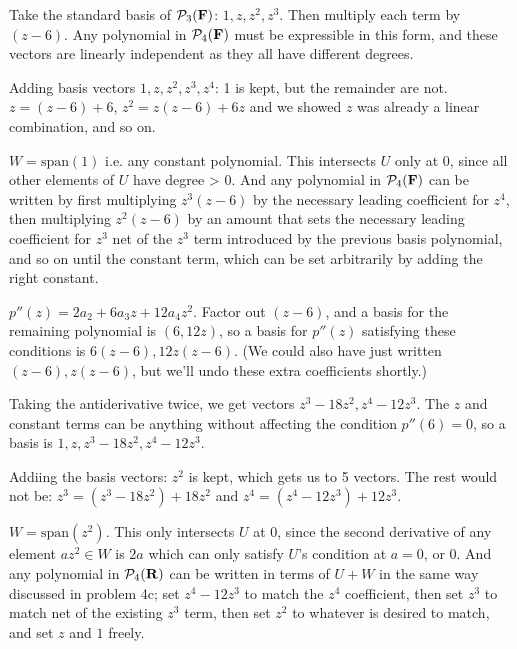 \documentclass{article}
\begin{document}

Take the standard basis of $\mathcal{P}_3(\mathbf{F})$: $1, z, z^2, z^3$. Then
multiply each term by $(z-6)$. Any polynomial in $\mathcal{P}_4(\mathbf{F})$ must be
expressible in this form, and these vectors are linearly independent as they all
have different degrees.


Adding basis vectors $1, z, z^2, z^3, z^4$: 1 is kept, but the remainder are
not. $z = (z-6) + 6$, $z^2 = z(z-6) + 6z$ and we showed $z$ was already a linear
combination, and so on.


$W = \text{span}(1)$ i.e. any constant polynomial. This intersects $U$ only at
0, since all other elements of $U$ have degree > 0. And any polynomial in
$\mathcal{P}_4(\mathbf{F})$ can be written by first multiplying $z^3(z-6)$ by the
necessary leading coefficient for $z^4$, then multiplying $z^2(z-6)$ by an
amount that sets the necessary leading coefficient for $z^3$ net of the $z^3$
term introduced by the previous basis polynomial, and so on until the constant
term, which can be set arbitrarily by adding the right constant.


$p''(z) = 2a_2 + 6a_3z + 12a_4z^2$. Factor out $(z-6)$, and a basis for the
remaining polynomial is $(6, 12z)$, so a basis for $p''(z)$ satisfying these
conditions is $6(z-6), 12z(z-6)$. (We could also have just written $(z-6),
z(z-6)$, but we'll undo these extra coefficients shortly.)

Taking the antiderivative twice, we get vectors $z^3 - 18z^2, z^4 - 12z^3$.
The $z$ and constant terms can be anything without affecting the condition
$p''(6) = 0$, so a basis is $1, z, z^3 - 18z^2, z^4 - 12z^3$.


Addiing the basis vectors: $z^2$ is kept, which gets us to 5 vectors. The rest
would not be: $z^3 = (z^3 - 18z^2) + 18z^2$ and $z^4 = (z^4 - 12z^3) + 12z^3$.


$W = \text{span}{(z^2)}$. This only intersects $U$ at 0, since the second
derivative of any element $az^2 \in W$ is $2a$ which can only satisfy $U$'s
condition at $a = 0$, or 0. And any polynomial in $\mathcal{P}_4(\mathbf{R})$ can be
written in terms of $U + W$ in the same way discussed in problem 4c; set $z^4 -
12z^3$ to match the $z^4$ coefficient, then set $z^3$ to match net of the
existing $z^3$ term, then set $z^2$ to whatever is desired to match, and set $z$
and $1$ freely.
\end{document}
